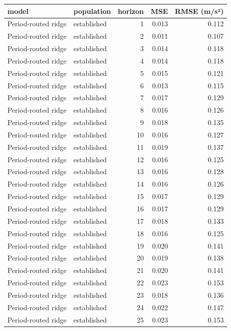 \begin{tabular}{llrrr}
\toprule
model & population & horizon & MSE & RMSE (m/s²) \\
\midrule
Period-routed ridge & established & 1 & 0.013 & 0.112 \\
Period-routed ridge & established & 2 & 0.011 & 0.107 \\
Period-routed ridge & established & 3 & 0.014 & 0.118 \\
Period-routed ridge & established & 4 & 0.014 & 0.118 \\
Period-routed ridge & established & 5 & 0.015 & 0.121 \\
Period-routed ridge & established & 6 & 0.013 & 0.115 \\
Period-routed ridge & established & 7 & 0.017 & 0.129 \\
Period-routed ridge & established & 8 & 0.016 & 0.126 \\
Period-routed ridge & established & 9 & 0.018 & 0.135 \\
Period-routed ridge & established & 10 & 0.016 & 0.127 \\
Period-routed ridge & established & 11 & 0.019 & 0.137 \\
Period-routed ridge & established & 12 & 0.016 & 0.125 \\
Period-routed ridge & established & 13 & 0.016 & 0.128 \\
Period-routed ridge & established & 14 & 0.016 & 0.126 \\
Period-routed ridge & established & 15 & 0.017 & 0.129 \\
Period-routed ridge & established & 16 & 0.017 & 0.129 \\
Period-routed ridge & established & 17 & 0.018 & 0.133 \\
Period-routed ridge & established & 18 & 0.016 & 0.125 \\
Period-routed ridge & established & 19 & 0.020 & 0.141 \\
Period-routed ridge & established & 20 & 0.019 & 0.138 \\
Period-routed ridge & established & 21 & 0.020 & 0.141 \\
Period-routed ridge & established & 22 & 0.023 & 0.153 \\
Period-routed ridge & established & 23 & 0.018 & 0.136 \\
Period-routed ridge & established & 24 & 0.022 & 0.147 \\
Period-routed ridge & established & 25 & 0.023 & 0.153 \\

\end{tabular}
